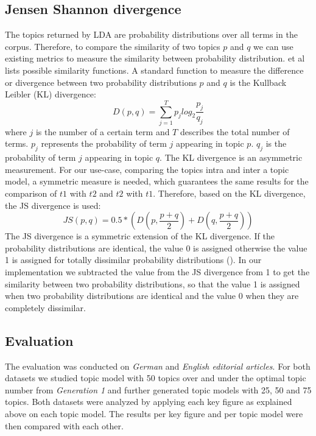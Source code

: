 \subsection{Jensen Shannon divergence}
The topics returned by \ac{LDA} are probability distributions over all terms in the corpus. Therefore, to compare the similarity of two topics $p$ and $q$ we can use existing metrics to measure the similarity between probability distribution. \cite{Lin1991} et al lists possible similarity functions. A standard function to measure the difference or divergence between two probability distributions $p$ and $q$ is the Kullback Leibler (\ac{KL}) divergence:
\begin{equation}
	D(p,q) = \sum_{j=1}^{T} p_{j} log_{2} \frac{p_{j}}{q_{j}}
\end{equation}
 where $j$ is the number of a certain term and $T$ describes the total number of terms. $p_{j}$ represents the probability of term $j$ appearing in topic $p$. $q_{j}$ is the probability of term $j$ appearing in topic $q$. The \ac{KL} divergence is an asymmetric measurement. For our use-case, comparing the topics intra and inter a topic model, a symmetric measure is needed, which guarantees the same results for the comparison of $t1$ with $t2$ and $t2$ with $t1$. Therefore, based on the \ac{KL} divergence, the \ac{JS} divergence is used:
\begin{equation}
	JS(p,q)  = 0.5 * (D(p,\frac{p + q}{2}) + D(q, \frac{p + q}{2}) )
\end{equation}
The \ac{JS} divergence  is a symmetric extension of the \ac{KL} divergence. If the probability distributions are identical, the value 0 is assigned otherwise the value 1 is assigned for totally dissimilar probability distributions (\cite{Steyvers2007}).
In our implementation we subtracted the value from the \ac{JS} divergence from 1 to get the similarity between two probability distributions, so that the value 1 is assigned when two probability distributions are identical and the value 0 when they are completely dissimilar. 

\subsection{Evaluation}
The evaluation was conducted on \textit{German} and \textit{English editorial articles}. For both datasets we studied topic model with 50 topics over and under the optimal topic number from \textit{Generation 1} and further generated topic models with 25, 50 and  75 topics. Both datasets were analyzed by applying each key figure as explained above on each topic model. The results per key figure and per topic model were then compared with each other.

